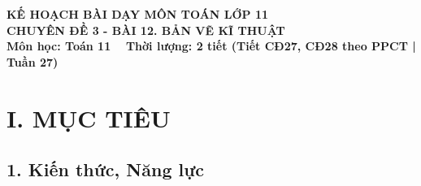 \documentclass[12pt, a4paper]{article}
\begin{document}
\begin{center}
    {\fontsize{14pt}{17pt}\selectfont \textbf{KẾ HOẠCH BÀI DẠY MÔN TOÁN LỚP 11}}\\[6pt]
    {\fontsize{16pt}{19pt}\selectfont \textbf{CHUYÊN ĐỀ 3 - BÀI 12. BẢN VẼ KĨ THUẬT}}\\[4pt]
    {\fontsize{12pt}{15pt}\selectfont \textbf{Môn học: Toán 11} \ \textbar \ \textbf{Thời lượng: 2 tiết (Tiết CĐ27, CĐ28 theo PPCT | Tuần 27)}}
\end{center}

\vspace{5pt}

\section*{I. MỤC TIÊU}

\subsection*{1. Kiến thức, Năng lực}
\end{document}
